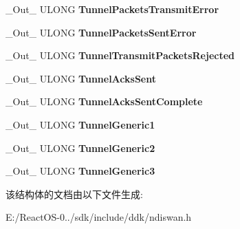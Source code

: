 \begin{DoxyCompactItemize}
\item 
\mbox{\label{struct___n_d_i_s___w_a_n___g_e_t___s_t_a_t_s___i_n_f_o_a85fa85dd48777dbd189afbb25def5945}} 
\+\_\+\+Out\+\_\+ U\+L\+O\+NG {\bfseries Tunnel\+Packets\+Transmit\+Error}
\item 
\mbox{\label{struct___n_d_i_s___w_a_n___g_e_t___s_t_a_t_s___i_n_f_o_a1f8f3bf9cbf2a2a85a8392496b4a42a4}} 
\+\_\+\+Out\+\_\+ U\+L\+O\+NG {\bfseries Tunnel\+Packets\+Sent\+Error}
\item 
\mbox{\label{struct___n_d_i_s___w_a_n___g_e_t___s_t_a_t_s___i_n_f_o_a8ff7c0dcf363d5d7c5a70873b39d5330}} 
\+\_\+\+Out\+\_\+ U\+L\+O\+NG {\bfseries Tunnel\+Transmit\+Packets\+Rejected}
\item 
\mbox{\label{struct___n_d_i_s___w_a_n___g_e_t___s_t_a_t_s___i_n_f_o_aafd078a568e3d6ae19e862c5643b3035}} 
\+\_\+\+Out\+\_\+ U\+L\+O\+NG {\bfseries Tunnel\+Acks\+Sent}
\item 
\mbox{\label{struct___n_d_i_s___w_a_n___g_e_t___s_t_a_t_s___i_n_f_o_a6e0f397ac06be7d7e8581ec3a989d86a}} 
\+\_\+\+Out\+\_\+ U\+L\+O\+NG {\bfseries Tunnel\+Acks\+Sent\+Complete}
\item 
\mbox{\label{struct___n_d_i_s___w_a_n___g_e_t___s_t_a_t_s___i_n_f_o_aeea2b6aaeb1bfa723176f797a1d2c910}} 
\+\_\+\+Out\+\_\+ U\+L\+O\+NG {\bfseries Tunnel\+Generic1}
\item 
\mbox{\label{struct___n_d_i_s___w_a_n___g_e_t___s_t_a_t_s___i_n_f_o_aaf42ca60c7dc1fdb88067e9a18ef51b0}} 
\+\_\+\+Out\+\_\+ U\+L\+O\+NG {\bfseries Tunnel\+Generic2}
\item 
\mbox{\label{struct___n_d_i_s___w_a_n___g_e_t___s_t_a_t_s___i_n_f_o_ac1c9c2a61635e40157a7f598e1236620}} 
\+\_\+\+Out\+\_\+ U\+L\+O\+NG {\bfseries Tunnel\+Generic3}
\end{DoxyCompactItemize}


该结构体的文档由以下文件生成\+:\begin{DoxyCompactItemize}
\item 
E\+:/\+React\+O\+S-\/0../sdk/include/ddk/ndiswan.\+h\end{DoxyCompactItemize}
